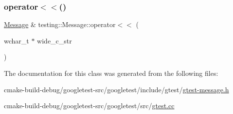 \mbox{\label{classtesting_1_1Message_ac1d3a041ac4bb9c929ee746b31a13d6a}} 
\subsubsection{\texorpdfstring{operator$<$$<$()}{operator<<()}\hspace{0.1cm}{\footnotesize\ttfamily [6/6]}}
{\footnotesize\ttfamily \mbox{\hyperlink{classtesting_1_1Message}{Message}} \& testing\+::\+Message\+::operator$<$$<$ (\begin{DoxyParamCaption}\item[{wchar\+\_\+t $\ast$}]{wide\+\_\+c\+\_\+str }\end{DoxyParamCaption})}



The documentation for this class was generated from the following files\+:\begin{DoxyCompactItemize}
\item 
cmake-\/build-\/debug/googletest-\/src/googletest/include/gtest/\mbox{\hyperlink{gtest-message_8h}{gtest-\/message.\+h}}\item 
cmake-\/build-\/debug/googletest-\/src/googletest/src/\mbox{\hyperlink{gtest_8cc}{gtest.\+cc}}\end{DoxyCompactItemize}
